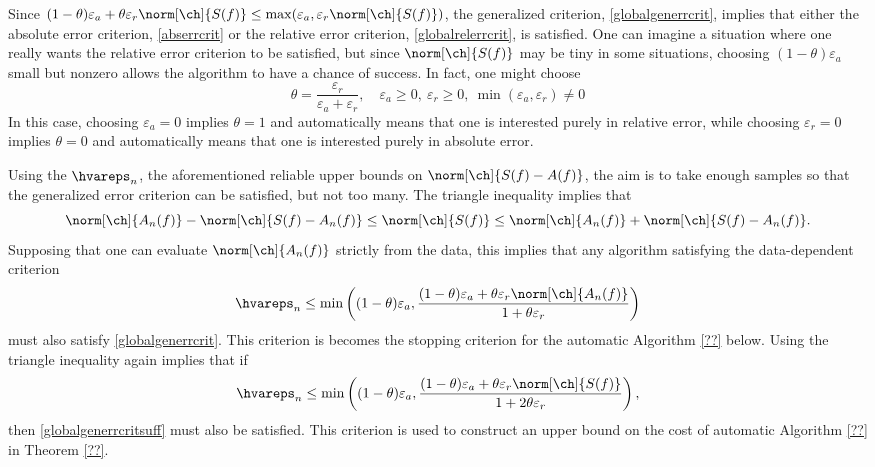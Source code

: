 \documentclass[]{elsarticle}
\theoremstyle{definition}
\theoremstyle{remark}
\begin{document}
Since $(1-\theta)\varepsilon_a + \theta \varepsilon_r \norm[\ch]{S(f)} \le \max( \varepsilon_a, \varepsilon_r \norm[\ch]{S(f)})$,
the generalized criterion, \eqref{globalgenerrcrit}, implies that either the absolute error criterion, \eqref{abserrcrit} or the relative error criterion, \eqref{globalrelerrcrit}, is satisfied.  One can imagine a situation where one really wants the relative error criterion to be satisfied, but since $\norm[\ch]{S(f)}$ may be tiny in some situations, choosing $(1-\theta)\varepsilon_a$ small but nonzero allows the algorithm to have a chance of success.  In fact, one might choose 
\[
\theta=\frac{\varepsilon_r}{\varepsilon_a + \varepsilon_r}, \quad \varepsilon_a \ge 0, \ \varepsilon_r \ge 0, \  \min(\varepsilon_a, \varepsilon_r) \ne 0
\]
In this case, choosing $\varepsilon_a=0$ implies $\theta=1$ and automatically means that one is interested purely in relative error, while choosing $\varepsilon_r=0$ implies $\theta=0$ and automatically means that one is interested purely in absolute error.

Using the $\hvareps_n$, the aforementioned reliable upper bounds on $\norm[\ch]{S(f)-A(f)}$, the aim is to take enough samples so that the generalized error criterion can be satisfied, but not too many.  The triangle inequality implies that
\[
\norm[\ch]{A_n(f)} - \norm[\ch]{S(f) - A_n(f)} \le \norm[\ch]{S(f)} \le \norm[\ch]{A_n(f)} + \norm[\ch]{S(f) - A_n(f)}.
\]
Supposing that one can evaluate $\norm[\ch]{A_n(f)}$ strictly from the data, this implies that any algorithm satisfying the data-dependent criterion
\begin{equation} \label{globalgenerrcritsuff}
\hvareps_n \le \min\left((1-\theta)\varepsilon_a,  \frac{(1-\theta)\varepsilon_a + \theta \varepsilon_r \norm[\ch]{A_n(f)}}{1 +  \theta \varepsilon_r} \right)
\end{equation}
must also satisfy \eqref{globalgenerrcrit}.  This criterion is becomes the stopping criterion for the automatic Algorithm \ref{??} below.  Using the triangle inequality again implies that if
\begin{equation} \label{globalgenerrcritsuffagain}
\hvareps_n \le \min\left((1-\theta)\varepsilon_a,  \frac{(1-\theta)\varepsilon_a + \theta \varepsilon_r \norm[\ch]{S(f)}}{1 +  2\theta \varepsilon_r} \right),
\end{equation}
then \eqref{globalgenerrcritsuff} must also be satisfied.  This criterion is used to construct an upper bound on the cost of automatic Algorithm \ref{??} in Theorem \ref{??}.  
\end{document}
